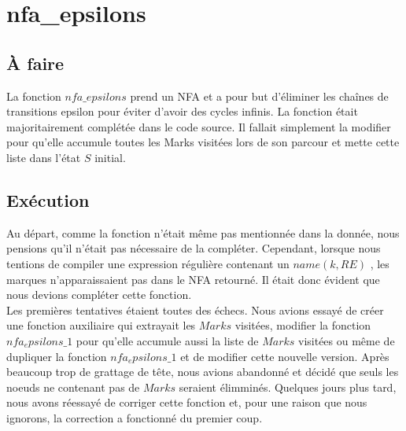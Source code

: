 \documentclass{article}
\begin{document}
 
\section{nfa\_epsilons}
\subsection{À faire}

    La fonction $nfa\_epsilons$ prend un NFA et a pour but d'éliminer les chaînes 
    de transitions epsilon pour éviter d'avoir des cycles infinis. La fonction 
    était majoritairement complétée dans le code source. 
    Il fallait simplement la modifier pour qu'elle accumule toutes les Marks 
    visitées lors de son parcour et mette cette liste dans l'état $S$ initial.

\subsection{Exécution}
    Au départ, comme la fonction n'était même pas mentionnée dans la donnée, 
    nous pensions qu'il n'était pas nécessaire de la compléter. Cependant, 
    lorsque nous tentions de compiler une expression régulière contenant un 
    $name(k, RE)$ , les marques n'apparaissaient pas dans le NFA retourné. 
    Il était donc évident que nous devions compléter cette fonction. \\
    Les premières tentatives étaient toutes des échecs. Nous avions essayé de 
    créer une fonction auxiliaire qui extrayait les $Marks$ visitées, modifier 
    la fonction $nfa_epsilons\_1$ pour qu'elle accumule aussi la liste de $Marks$ 
    visitées ou même de dupliquer la fonction $nfa_epsilons\_1$ et de modifier 
    cette nouvelle version. Après beaucoup trop de grattage de tête, nous 
    avions abandonné et décidé que seuls les noeuds ne contenant pas de 
    $Marks$ seraient élimminés. Quelques jours plus tard, nous avons réessayé 
    de corriger cette fonction et, pour une raison que nous ignorons, la 
    correction a fonctionné du premier coup. 
\end{document}
